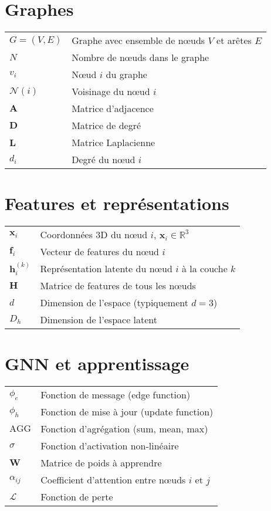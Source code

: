 
\section*{Graphes}

\begin{tabular}{p{2.5cm} p{11cm}}
  \hline
  $G = (V, E)$ & Graphe avec ensemble de nœuds $V$ et arêtes $E$\\
  $N$ & Nombre de nœuds dans le graphe\\
  $v_i$ & Nœud $i$ du graphe\\
  $\mathcal{N}(i)$ & Voisinage du nœud $i$\\
  $\mathbf{A}$ & Matrice d'adjacence\\
  $\mathbf{D}$ & Matrice de degré\\
  $\mathbf{L}$ & Matrice Laplacienne\\
  $d_i$ & Degré du nœud $i$\\
  \hline
\end{tabular}

\section*{Features et représentations}

\begin{tabular}{p{2.5cm} p{11cm}}
  \hline
  $\mathbf{x}_i$ & Coordonnées 3D du nœud $i$, $\mathbf{x}_i \in \mathbb{R}^3$\\
  $\mathbf{f}_i$ & Vecteur de features du nœud $i$\\
  $\mathbf{h}_i^{(k)}$ & Représentation latente du nœud $i$ à la couche $k$\\
  $\mathbf{H}$ & Matrice de features de tous les nœuds\\
  $d$ & Dimension de l'espace (typiquement $d=3$)\\
  $D_h$ & Dimension de l'espace latent\\
  \hline
\end{tabular}

\section*{GNN et apprentissage}

\begin{tabular}{p{2.5cm} p{11cm}}
  \hline
  $\phi_e$ & Fonction de message (edge function)\\
  $\phi_h$ & Fonction de mise à jour (update function)\\
  $\text{AGG}$ & Fonction d'agrégation (sum, mean, max)\\
  $\sigma$ & Fonction d'activation non-linéaire\\
  $\mathbf{W}$ & Matrice de poids à apprendre\\
  $\alpha_{ij}$ & Coefficient d'attention entre nœuds $i$ et $j$\\
  $\mathcal{L}$ & Fonction de perte\\
  \hline
\end{tabular}

